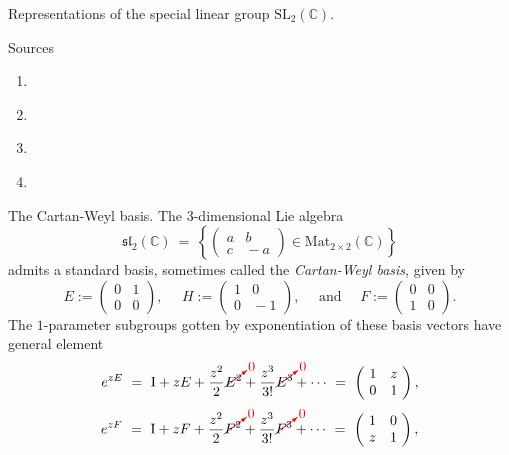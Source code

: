\documentclass[letterpaper,11pt, reqno]{amsart}
\newtheorem{monodromy theorem}{Monodromy Theorem}[subsection]
\newtheorem{wild conjecture}[theorem]{Wild Conjecture}
\newtheorem{research objectives}{Research objectives}[subsection]
\newtheorem{research question}[theorem]{Research questions}
\newtheorem{aside question}[theorem]{Aside question}
\newtheorem{audio example}[theorem]{\loudspeaker[3] Example}
\newtheorem{blank remark}[theorem]{}
\newtheorem{terminology and comment}[theorem]{Terminology and comment}
\newtheorem{purity hypothesis}[theorem]{Purity hypothesis}
\newtheorem{corollary of the purity hypothesis}[theorem]{Corollary of the purity hypothesis}
\newcommand{\CC} {{\mathbb C}}
\numberwithin{equation}{theorem}
\begin{document}
\begin{section}{Representations of the special linear group $\text{SL}_{2}(\CC)$.}

\begin{subsection}{Sources}
	\begin{enumerate}[{\bf\ \ \ \ \ \ 1.}]
	\item
	\cite{FH}
	\item
	\cite{Proc}
	\item
	\cite{Knapp86}
	\item
	\cite{Knapp02}
	\end{enumerate}
\end{subsection}

\begin{subsection}{The Cartan-Weyl basis.} The $3$-dimensional Lie algebra
	$$
	\mathfrak{sl}_2(\CC)
	\ =\ 
	\left\{
	\left(\!\begin{array}{cc}a & b \\ c & \!\!-a\end{array}\!\right)\in\text{Mat}_{2\times2}(\CC)
	\right\}
	$$
admits a standard basis, sometimes called the {\em Cartan-Weyl basis}, given by
	$$
	E:=\left(\!\begin{array}{cc}0 & 1 \\ 0 & 0\end{array}\!\right),
	\ \ \ \ \ \ 
	H:=\left(\!\begin{array}{cc}1 & 0 \\ 0 & \!\!-1\end{array}\!\right),
	\ \ \ \ \ \ 
	\text{and}
	\ \ \ \ \ \ 
	F:=\left(\!\begin{array}{cc} 0 & 0 \\ 1 & 0\end{array}\!\right).
	$$
The $1$-parameter subgroups gotten by exponentiation of these basis vectors have general element
	$$
	e^{zE}
	\ =\ 
	\text{I}+zE+\frac{z^2}{2}{\color{red} \cancelto{0}{{\color{black} E^2}}}+\frac{z^3}{3!}{\color{red} \cancelto{0}{{\color{black} E^3}}}+\cdots
	\ =\ 
	\left(\!\begin{array}{cc} 1 & z \\ 0 & 1\end{array}\!\right),
	$$
	$$
	e^{zF}
	\ =\ 
	\text{I}+zF+\frac{z^2}{2}{\color{red} \cancelto{0}{{\color{black} F^2}}}+\frac{z^3}{3!}{\color{red} \cancelto{0}{{\color{black} F^3}}}+\cdots
	\ =\ 
	\left(\!\begin{array}{cc} 1 & 0 \\ z & 1\end{array}\!\right),
$$
\end{subsection}
\end{section}
\end{document}
